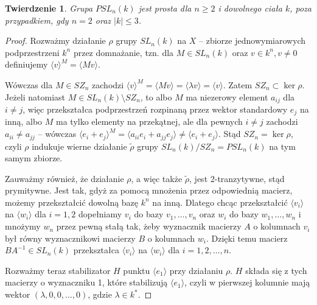 \documentclass[licencjacka]{pracamgr}
\newtheorem{thh}{Twierdzenie}[section]
\begin{document}
\begin{thh}\label{PSL_simplicy}
  Grupa $PSL_n(k)$ jest prosta dla $n \ge 2$ i dowolnego ciała $k$, poza przypadkiem, gdy $n = 2$ oraz $|k| \le 3$.
\end{thh}
\begin{proof}
  Rozważmy działanie $\rho$ grupy $SL_n(k)$ na $X$ -- zbiorze jednowymiarowych podprzestrzeni $k^n$ przez domnażanie,
  tzn. dla $M \in SL_n(k)$ oraz $v \in k^n, v \ne 0$ definiujemy $\langle v \rangle ^ M = \langle Mv \rangle$.
  
  Wówczas dla $M \in SZ_n$ zachodzi $\langle v \rangle ^ M = \langle M v \rangle = \langle \lambda v \rangle = \langle v \rangle$.
  Zatem $SZ_n \subset \ker \rho$. Jeżeli natomiast $M \in SL_n(k) \setminus SZ_n$, to albo $M$ ma niezerowy element $a_{i j}$ dla $i \ne j$, 
  więc przekształca podprzestrzeń rozpinaną przez wektor standardowy $e_j$ na inną, albo $M$ ma tylko elementy na przekątnej, 
  ale dla pewnych $i \ne j$ zachodzi $a_{i i} \ne a_{j j}$ -- wówczas $\langle e_i + e_j \rangle^M = \langle a_{i i} e_i + a_{j j} e_j \rangle \ne \langle  e_i + e_j \rangle$.
  Stąd $SZ_n = \ker \rho$, czyli $\rho$ indukuje wierne działanie $\tilde{\rho}$ grupy $SL_n(k) / SZ_n = PSL_n(k)$ na tym samym zbiorze.

  Zauważmy również, że działanie $\rho$, a więc także $\tilde{\rho}$, jest 2-tranzytywne, stąd prymitywne.
  Jest tak, gdyż za pomocą mnożenia przez odpowiednią macierz, możemy przekształcić dowolną bazę $k^n$ na inną.
  Dlatego chcąc przekształcić $\langle v_i \rangle$ na $\langle w_i \rangle$ dla $i = 1, 2$ dopełniamy $v_i$ do bazy $v_1, \ldots, v_n$
  oraz $w_i$ do bazy $w_1, \ldots, w_n$ i mnożymy $w_n$ przez pewną stałą tak, żeby wyznacznik macierzy $A$ o kolumnach $v_i$ 
  był równy wyznacznikowi macierzy $B$ o kolumnach $w_i$. 
  Dzięki temu macierz $B A^{-1} \in SL_n(k)$ przekształca $\langle v_i \rangle$ na $\langle w_i \rangle$ dla $i = 1, 2, \ldots, n$.

  Rozważmy teraz stabilizator $H$ punktu $\langle e_1 \rangle$ przy działaniu $\rho$.
  $H$ składa się z tych macierzy o wyznaczniku 1, które stabilizują $\langle e_1 \rangle$,
  czyli w pierwszej kolumnie mają wektor $(\lambda, 0, 0, \ldots, 0)$, gdzie $\lambda \in k^*$.


\end{proof}
\end{document}
